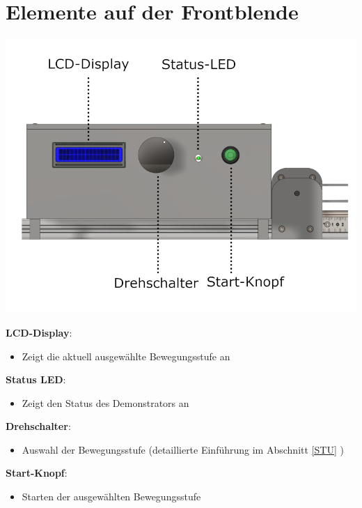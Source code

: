 %
%

\chapter{Elemente auf der Frontblende}
\begin{center}
	
	\includegraphics[width=\textwidth]{Images/Konstruktion2.png}
\end{center}

	\textbf{LCD-Display}: 
\begin{itemize}
	\item Zeigt die aktuell ausgewählte Bewegungsstufe an
\end{itemize}

	\textbf{Status LED}: 
\begin{itemize}
	\item Zeigt den Status des Demonstrators an
\end{itemize}

	\textbf{Drehschalter}: 
\begin{itemize}
	\item Auswahl der Bewegungsstufe (detaillierte Einführung im Abschnitt \ref{STU} )
\end{itemize}

	\textbf{Start-Knopf}: 
\begin{itemize}
	\item Starten der ausgewählten Bewegungsstufe
\end{itemize}
